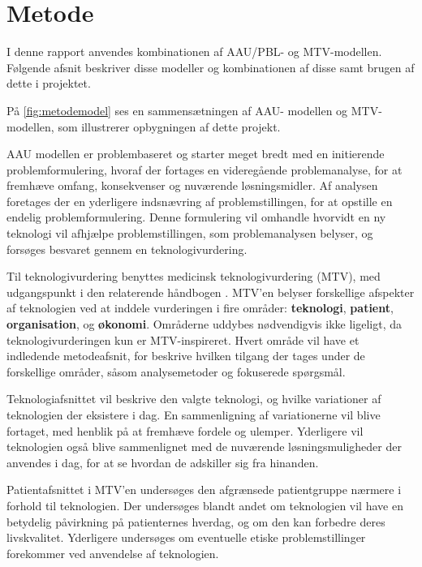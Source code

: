 \chapter{Metode} \label{metode}
I denne rapport anvendes kombinationen af AAU/PBL- og MTV-modellen. Følgende afsnit beskriver disse modeller og kombinationen af disse samt brugen af dette i projektet. 


På \ref{fig:metodemodel} ses en sammensætningen af AAU- modellen og MTV-modellen, som illustrerer opbygningen af dette projekt.

AAU modellen er problembaseret og starter meget bredt med en initierende problemformulering, hvoraf der fortages en videregående problemanalyse, for at fremhæve omfang, konsekvenser og nuværende løsningsmidler. 
Af analysen foretages der en yderligere indsnævring af problemstillingen, for at opstille en endelig problemformulering. Denne formulering vil omhandle hvorvidt en ny teknologi vil afhjælpe problemstillingen, som problemanalysen belyser, og forsøges besvaret gennem en teknologivurdering. 

Til teknologivurdering benyttes medicinsk teknologivurdering (MTV), med udgangspunkt i den relaterende håndbogen \citep{mtvhaandbog}. 
MTV'en belyser forskellige afspekter af teknologien ved at inddele vurderingen i fire områder: \textbf{teknologi}, \textbf{patient}, \textbf{organisation}, og \textbf{økonomi}. Områderne uddybes nødvendigvis ikke ligeligt, da teknologivurderingen kun er MTV-inspireret. 
Hvert område vil have et indledende metodeafsnit, for beskrive hvilken tilgang der tages under de forskellige områder, såsom analysemetoder og fokuserede spørgsmål. 

Teknologiafsnittet vil beskrive den valgte teknologi, og hvilke variationer af teknologien der eksistere i dag. En sammenligning af variationerne vil blive fortaget, med henblik på at fremhæve fordele og ulemper. Yderligere vil teknologien også blive sammenlignet med de nuværende løsningsmuligheder der anvendes i dag, for at se hvordan de adskiller sig fra hinanden.  


Patientafsnittet i MTV’en undersøges den afgrænsede patientgruppe nærmere i forhold til teknologien. Der undersøges blandt andet om teknologien vil have en betydelig påvirkning på patienternes hverdag, og om den kan forbedre deres livskvalitet. Yderligere undersøges om eventuelle etiske problemstillinger forekommer ved anvendelse af teknologien.

